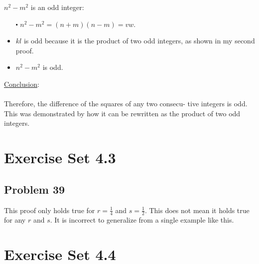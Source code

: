 \documentclass[12pt]{article}
\begin{document}
\newblock
$n^2 - m^2$ is an odd integer:
\begin{itemize}
  \item [$\centerdot$] $n^2 - m^2 = (n+m)(n-m) = vw$.
  \item $kl$ is odd because it is the product of two odd integers, as shown in my second proof.
  \item $n^2 - m^2$ is odd.
\end{itemize}
\underline{Conclusion}:
\\ \\
Therefore, the difference of the squares of any two consecu- tive integers is odd. This was demonstrated by how it can be rewritten as the product of two odd integers.
\section*{Exercise Set 4.3}
\subsection*{Problem 39}
This proof only holds true for $r= \frac{1}{4}$ and $s=\frac{1}{2}$. This does not mean it holds true for any $r$ and $s$. It is incorrect to generalize from a single example like this.
\section*{Exercise Set 4.4}
\end{document}
